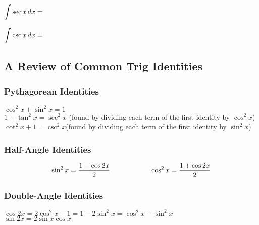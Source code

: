 \documentclass[12pt]{article}
\begin{document}
$\displaystyle\int\sec x\,dx=$

\vspace{50mm}

$\displaystyle\int\csc x\,dx=$

\vspace{10mm}

\subsection*{A Review of Common Trig Identities}

\vspace{3mm}

\subsubsection*{Pythagorean Identities}

\hspace{5mm}$\cos^2x+\sin^2x=1$\\

\hspace{5mm}$1+\tan^2x = \sec^2 x$ \hfill (found by dividing each term of the first identity by $\cos^2x$)\\

\hspace{5mm}$\cot^2x+1=\csc^2x$\hfill (found by dividing each term of the first identity by $\sin^2x$)

\vspace{3mm}

\subsubsection*{Half-Angle Identities}

\vspace{2mm}

$$\sin^2x=\frac{1-\cos 2x}{2}\hspace{20mm} \cos^2x=\frac{1+\cos 2x}{2}$$

\vspace{3mm}

\subsubsection*{Double-Angle Identities}

\hspace{5mm}$\cos 2x=2\cos^2x-1=1-2\sin^2x=\cos^2x-\sin^2x$\\

\hspace{5mm}$\sin 2x=2\sin x \cos x$
\end{document}
